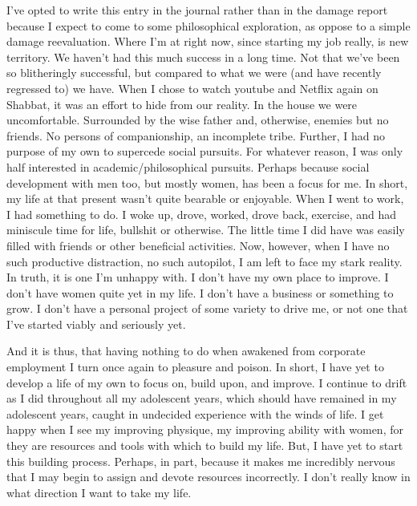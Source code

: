 I've opted to write this entry in the journal rather than in the damage
report because I expect to come to some philosophical exploration, as
oppose to a simple damage reevaluation. Where I'm at right now, since
starting my job really, is new territory. We haven't had this much
success in a long time. Not that we've been so blitheringly successful,
but compared to what we were (and have recently regressed to) we have.
When I chose to watch youtube and Netflix again on Shabbat, it was an
effort to hide from our reality. In the house we were uncomfortable.
Surrounded by the wise father and, otherwise, enemies but no friends. No
persons of companionship, an incomplete tribe. Further, I had no purpose
of my own to supercede social pursuits. For whatever reason, I was only
half interested in academic/philosophical pursuits. Perhaps because
social development with men too, but mostly women, has been a focus for
me. In short, my life at that present wasn't quite bearable or
enjoyable. When I went to work, I had something to do. I woke up, drove,
worked, drove back, exercise, and had miniscule time for life, bullshit
or otherwise. The little time I did have was easily filled with friends
or other beneficial activities. Now, however, when I have no such
productive distraction, no such autopilot, I am left to face my stark
reality. In truth, it is one I'm unhappy with. I don't have my own place
to improve. I don't have women quite yet in my life. I don't have a
business or something to grow. I don't have a personal project of some
variety to drive me, or not one that I've started viably and seriously
yet.

And it is thus, that having nothing to do when awakened from corporate
employment I turn once again to pleasure and poison. In short, I have
yet to develop a life of my own to focus on, build upon, and improve. I
continue to drift as I did throughout all my adolescent years, which
should have remained in my adolescent years, caught in undecided
experience with the winds of life. I get happy when I see my improving
physique, my improving ability with women, for they are resources and
tools with which to build my life. But, I have yet to start this
building process. Perhaps, in part, because it makes me incredibly
nervous that I may begin to assign and devote resources incorrectly. I
don't really know in what direction I want to take my life.

